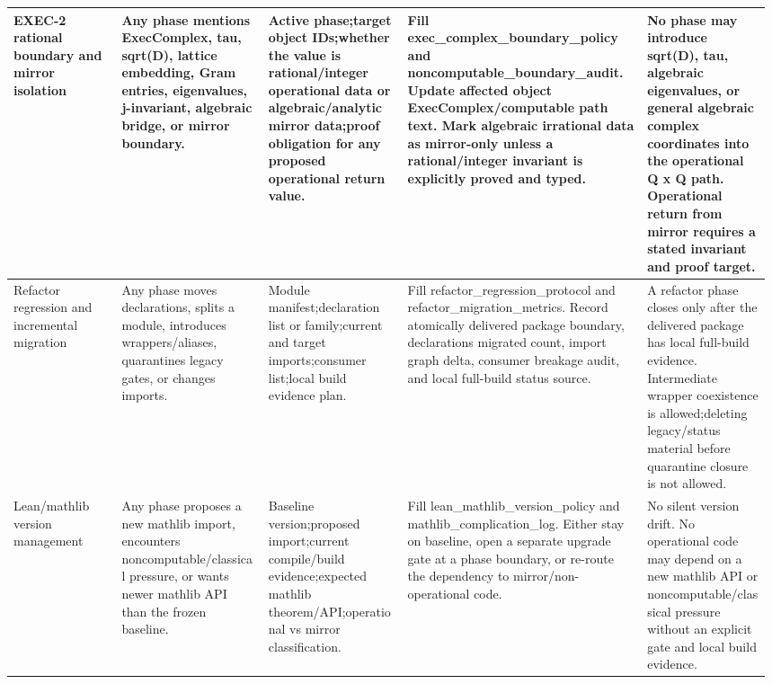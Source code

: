 \begin{longtable}{L{0.14\linewidth} L{0.19\linewidth} L{0.18\linewidth} L{0.31\linewidth} L{0.16\linewidth}}
\hline
\addlinespace[0.24em]
EXEC-2 rational boundary and mirror isolation & Any phase mentions ExecComplex, tau, sqrt(D), lattice embedding, Gram entries, eigenvalues, j-invariant, algebraic bridge, or mirror boundary. & Active phase;\newline target object IDs;\newline whether the value is rational/\allowbreak{}integer operational data or algebraic/\allowbreak{}analytic mirror data;\newline proof obligation for any proposed operational return value. & Fill exec\_complex\_boundary\_policy and noncomputable\_boundary\_audit. Update affected object ExecComplex/\allowbreak{}computable path text. Mark algebraic irrational data as mirror-only unless a rational/\allowbreak{}integer invariant is explicitly proved and typed. & No phase may introduce sqrt(D), tau, algebraic eigenvalues, or general algebraic complex coordinates into the operational Q x Q path. Operational return from mirror requires a stated invariant and proof target.\\
\hline
\addlinespace[0.24em]
Refactor regression and incremental migration & Any phase moves declarations, splits a module, introduces wrappers/\allowbreak{}aliases, quarantines legacy gates, or changes imports. & Module manifest;\newline declaration list or family;\newline current and target imports;\newline consumer list;\newline local build evidence plan. & Fill refactor\_regression\_protocol and refactor\_migration\_metrics. Record atomically delivered package boundary, declarations migrated count, import graph delta, consumer breakage audit, and local full-build status source. & A refactor phase closes only after the delivered package has local full-build evidence. Intermediate wrapper coexistence is allowed;\newline deleting legacy/\allowbreak{}status material before quarantine closure is not allowed.\\
\hline
\addlinespace[0.24em]
Lean/\allowbreak{}mathlib version management & Any phase proposes a new mathlib import, encounters noncomputable/\allowbreak{}classical pressure, or wants newer mathlib API than the frozen baseline. & Baseline version;\newline proposed import;\newline current compile/\allowbreak{}build evidence;\newline expected mathlib theorem/\allowbreak{}API;\newline operational vs mirror classification. & Fill lean\_mathlib\_version\_policy and mathlib\_complication\_log. Either stay on baseline, open a separate upgrade gate at a phase boundary, or re-route the dependency to mirror/\allowbreak{}non-operational code. & No silent version drift. No operational code may depend on a new mathlib API or noncomputable/\allowbreak{}classical pressure without an explicit gate and local build evidence.\\

\end{longtable}
